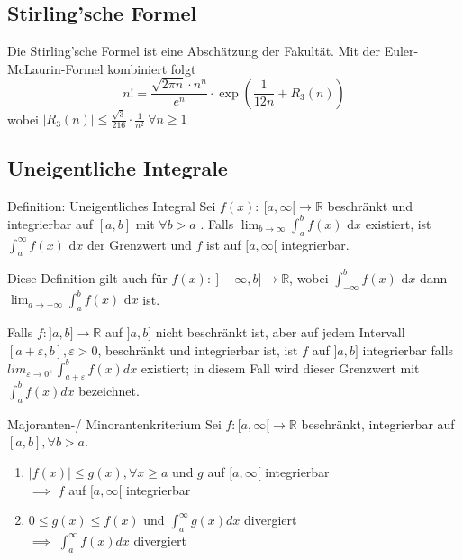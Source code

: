 \documentclass[a4paper,fontsize = 7pt]{scrartcl}
\def\R{\mathbb{R}}
\def\dx{\text{ d}x}
\begin{document}
\subsection{Stirling'sche Formel}
Die Stirling'sche Formel ist eine Abschätzung der Fakultät. Mit der Euler-McLaurin-Formel kombiniert folgt
$$n! = \frac{\sqrt{2\pi n} \cdot n^n}{e^n} \cdot \exp(\frac{1}{12n}+R_3(n))$$
wobei $|R_3(n)| \le \frac{\sqrt{3}}{216}\cdot\frac{1}{n^2} \ \forall n \ge 1$

\subsection{Uneigentliche Integrale}
\begin{subbox}{Definition: Uneigentliches Integral}
  \vspace{-4pt}
 Sei $f(x): \ [ a,\infty [ \to \R$ beschränkt und integrierbar auf $[a,b] $ mit $\forall b > a$ . Falls $\lim_{b\to\infty} \int_a^b f(x) \dx$ existiert, ist $\int_a^\infty f(x) \dx$ der Grenzwert und $f$ ist auf $[a, \infty[$ integrierbar.
 \vspace{-4pt}
\end{subbox}
Diese Definition gilt auch für $f(x) : \ ]-\infty,b] \to \R$, wobei $\int_{-\infty}^b f(x) \dx $ dann $ \lim_{a\to-\infty} \int_a^b f(x) \dx$ ist.

\begin{mainbox}{}
  \vspace{-4pt}
Falls $f: ]a,b] \to \R$ auf $]a, b]$ nicht beschränkt ist, aber auf jedem Intervall $[a+\varepsilon, b], \varepsilon > 0$, beschränkt und integrierbar ist, ist $f$ auf $]a,b]$ integrierbar falls
$lim_{\varepsilon \to 0^+} \int_{a+\varepsilon}^b f(x) dx$ existiert; in diesem Fall wird dieser Grenzwert mit $\int_a^b f(x)dx$ bezeichnet.
  \vspace{-4pt}
\end{mainbox}

\begin{mainbox}{Majoranten-/ Minorantenkriterium}
  \vspace{-4pt}
Sei $f: [a, \infty[ \to \R$ beschränkt, integrierbar auf $[a, b], \forall b > a$.
\begin{enumerate}
  \item $|f(x)| \leq g(x) ,\forall x \geq a$ und $g$ auf $[a, \infty[$ integrierbar
  \\$\implies$ $f$ auf $[a, \infty[$ integrierbar
  \item $0 \leq g(x) \leq f(x)$ und $\int_a^{\infty}g(x)dx$ divergiert
  \\$\implies$ $\int_a^{\infty}f(x)dx$ divergiert
\end{enumerate}
\vspace{-12pt}
\end{mainbox}
\end{document}
